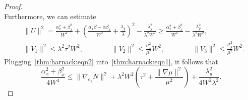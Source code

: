 \documentclass[a4paper,10pt,reqno]{amsart}
\theoremstyle{definition}
\theoremstyle{remark}
\numberwithin{equation}{section}
\begin{document}
\begin{proof}
\begin{equation}
\end{equation}
Furthermore, we can estimate
\begin{equation}\label{thm:harnack:eqn2}
\begin{aligned}&\|U\|^2=\frac{\alpha_x^2+\beta_x^2}{W^4}+\left(\frac{\alpha_x\beta-\alpha\beta_x}{W^2}+\frac{\lambda_y}{\lambda}\right)^2-\frac{\lambda_y^2}{\lambda^2W^2}\geq \frac{\alpha_x^2+\beta_x^2}{W^4}-\frac{\lambda_y^2}{\lambda^2W^2},\\
&\|V_1\|^2\leq\lambda^2\tau^2W^2,\qquad\qquad\|V_2\|^2\leq\frac{\mu_x^2}{\mu^2}W^2,\qquad\qquad\|V_3\|^2\leq \frac{\mu_y^2}{\mu^2}W^2.
\end{aligned}\end{equation}
Plugging~\eqref{thm:harnack:eqn2} into~\eqref{thm:harnack:eqn1}, it follows that
\begin{equation}\label{thm:harnack:eqn3}
\frac{\alpha_x^2+\beta_x^2}{4W^4}\leq\|\overline\nabla_{e_1}N\|^2+\lambda^2W^2\left(\tau^2+\frac{\|\nabla\mu\|^2}{\mu^2}\right)+\frac{\lambda_y^2}{4W^2\lambda^2}.\end{equation}


\end{proof}
\end{document}
